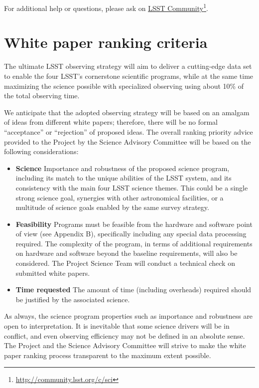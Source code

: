 \documentclass[DM,lsstdraft,toc,usenatbib]{lsstdoc}
\begin{document}
For additional help or questions, please ask on \href{https://community.lsst.org/c/sci}{LSST Community}\footnote{\url{http://community.lsst.org/c/sci}}. 


\section{White paper ranking criteria \label{sec:ranking}} 

The ultimate LSST observing strategy will aim to deliver a cutting-edge data set to enable
the four LSST's cornerstone scientific programs, while at the same time maximizing the 
science possible with specialized observing using about 10\% of the total observing time. 

We anticipate that the adopted observing strategy will be based on an amalgam of ideas from 
different white papers; therefore, there will be no formal ``acceptance'' or ``rejection'' of
proposed ideas. The overall ranking priority advice provided to the Project by the Science Advisory Committee 
will be based on the following considerations: 
\begin{itemize}
\item {\bf Science} Importance and robustness of the proposed science program, including 
           its match to the unique abilities of the LSST system, and its consistency with the 
           main four LSST science themes. This could be a single strong science goal, synergies with
           other astronomical facilities, or a multitude of science goals enabled by the same survey strategy. 
\item {\bf Feasibility} Programs must be feasible from the hardware and software point of view (see Appendix B),
         specifically including any special data processing required. The complexity of the program, in terms of additional
         requirements on hardware and software beyond the baseline requirements, will also be considered. 
         The Project Science Team will conduct a technical check on submitted white papers.
\item {\bf Time requested} The amount of time (including overheads) required should be justified by 
        the associated science. 
\end{itemize} 

As always, the science program properties such as importance and robustness are open
to interpretation. It is inevitable that some science drivers will be in conflict, and even
observing efficiency may not be defined in an absolute sense. The Project and the Science Advisory 
Committee will strive to make the white paper ranking process transparent to the maximum extent possible. 
\end{document}
